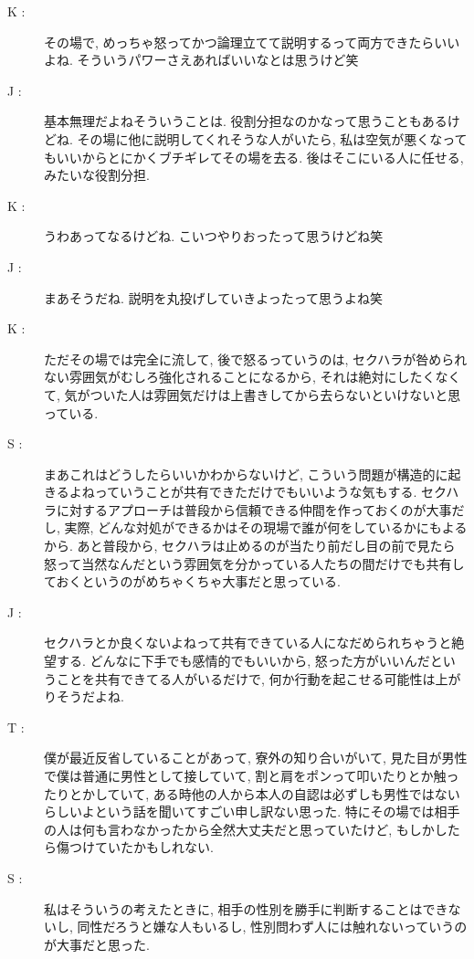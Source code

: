 \documentclass[10pt,b5jsbook,dvips,dvipdfmx,openany]{jsbook}
\theoremstyle{definition}
\begin{document}
\begin{description}
		\item[ K : ] その場で, めっちゃ怒ってかつ論理立てて説明するって両方できたらいいよね. そういうパワーさえあればいいなとは思うけど笑

		\item[ J : ] 基本無理だよねそういうことは. 役割分担なのかなって思うこともあるけどね. その場に他に説明してくれそうな人がいたら, 私は空気が悪くなってもいいからとにかくブチギレてその場を去る. 後はそこにいる人に任せる, みたいな役割分担.

		\item[ K : ] うわあってなるけどね. こいつやりおったって思うけどね笑

		\item[ J : ] まあそうだね. 説明を丸投げしていきよったって思うよね笑

		\item[ K : ] ただその場では完全に流して, 後で怒るっていうのは, セクハラが咎められない雰囲気がむしろ強化されることになるから, それは絶対にしたくなくて, 気がついた人は雰囲気だけは上書きしてから去らないといけないと思っている.

		\item[ S : ] まあこれはどうしたらいいかわからないけど, こういう問題が構造的に起きるよねっていうことが共有できただけでもいいような気もする. セクハラに対するアプローチは普段から信頼できる仲間を作っておくのが大事だし, 実際, どんな対処ができるかはその現場で誰が何をしているかにもよるから. あと普段から, セクハラは止めるのが当たり前だし目の前で見たら怒って当然なんだという雰囲気を分かっている人たちの間だけでも共有しておくというのがめちゃくちゃ大事だと思っている.

		\item[ J : ] セクハラとか良くないよねって共有できている人になだめられちゃうと絶望する. どんなに下手でも感情的でもいいから, 怒った方がいいんだということを共有できてる人がいるだけで, 何か行動を起こせる可能性は上がりそうだよね.

		\item[ T : ] 僕が最近反省していることがあって, 寮外の知り合いがいて, 見た目が男性で僕は普通に男性として接していて, 割と肩をポンって叩いたりとか触ったりとかしていて, ある時他の人から本人の自認は必ずしも男性ではないらしいよという話を聞いてすごい申し訳ない思った. 特にその場では相手の人は何も言わなかったから全然大丈夫だと思っていたけど, もしかしたら傷つけていたかもしれない.

		\item[ S : ] 私はそういうの考えたときに, 相手の性別を勝手に判断することはできないし, 同性だろうと嫌な人もいるし, 性別問わず人には触れないっていうのが大事だと思った.


\end{description}
\end{document}

